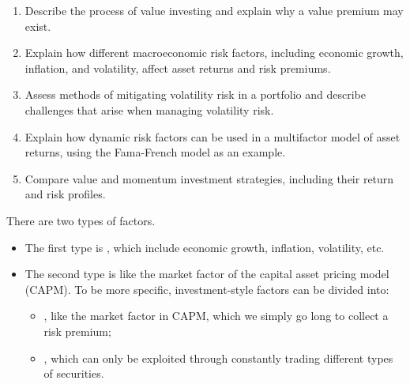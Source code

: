 

\begin{imkeybox}[title={The five objectives in this reading}]
\begin{enumerate}[label=\textbf{\alph*.}]
\item Describe the process of value investing and explain why a value premium may exist.
\item Explain how different macroeconomic risk factors, including economic growth, inflation, and volatility, affect asset returns and risk premiums.
\item Assess methods of mitigating volatility risk in a portfolio and describe challenges that arise when managing volatility risk.
\item Explain how dynamic risk factors can be used in a multifactor model of asset returns, using the Fama-French model as an example.
\item Compare value and momentum investment strategies, including their return and risk profiles.
\end{enumerate}
\end{imkeybox}


There are two types of factors.

\begin{itemize}
\item The first type is , which include
economic growth, inflation, volatility, etc.
\item The second type is  like the market factor
of the capital asset pricing model (CAPM). To be more specific, investment-style
factors can be divided into:
  \begin{itemize}
  \item {}, like the market factor in CAPM, which we simply go
  long to collect a risk premium;
  \item {}, which can only be exploited through constantly
  trading different types of securities.
  \end{itemize}
\end{itemize}


